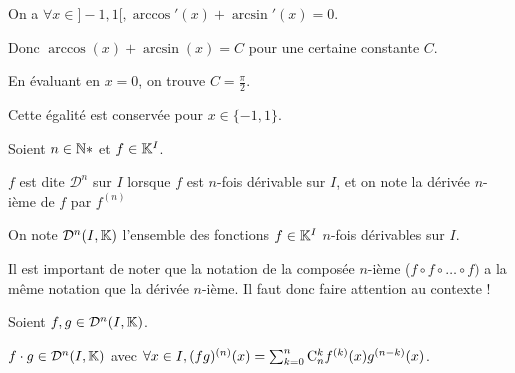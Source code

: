 \documentclass[12pt, a4paper]{report}
\begin{document}
\begin{remark}
  On a $\forall x \in ]-1,1[, \arccos'(x) + \arcsin'(x)=0$.

  Donc $\arccos(x) + \arcsin(x) = C$ pour une certaine constante $C$.

  En évaluant en $x=0$, on trouve $C = \frac{\pi}{2}$.
  
  Cette égalité est conservée pour $x\in\{-1,1\}$.
\end{remark}

\begin{definition}
	Soient $n\in\mathbb{N}*$ et $f\in\mathbb{K}^I$.
	
	$f$ est dite $\mathcal{D}^n$ sur $I$ lorsque $f$ est $n$-fois dérivable sur $I$, et on note la dérivée $n$-ième de $f$ par $f^{(n)}$

  On note $\mathcal{D}^n(I,\mathbb{K})$ l'ensemble des fonctions $f\in\mathbb{K}^I$ $n$-fois dérivables sur $I$.
\end{definition}

\begin{remark}
	Il est important de noter que la notation de la composée $n$-ième ($f\circ f\circ \dots \circ f)$ a la même notation que la dérivée $n$-ième. Il faut donc faire attention au contexte !
\end{remark}

\begin{property}
    Soient $f,g \in \mathcal{D}^n(I,\mathbb{K})$.

    \begin{keyformula}
    $f\cdot g \in \mathcal{D}^n(I,\mathbb{K})$ avec $\forall x \in I, (fg)^{(n)}(x) = \sum_{k=0}^{n} \mathrm{C}_{n}^{k} f^{(k)}(x) g^{(n-k)}(x)$.
    \end{keyformula}
\end{property}
\end{document}
